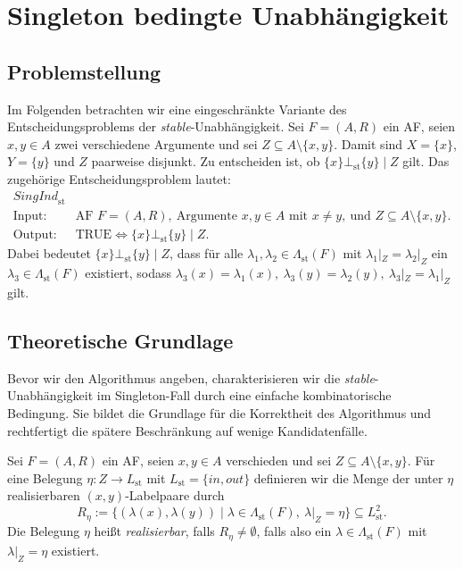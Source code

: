 \chapter{Singleton bedingte Unabhängigkeit}
\label{ch:singl-ci}

\section{Problemstellung}
\label{sec:singl-ci-def}
Im Folgenden betrachten wir eine eingeschränkte Variante des Entscheidungsproblems
der \textit{stable}-Unabhängigkeit. Sei \(F=(A,R)\) ein AF, seien
\(x,y\in A\) zwei verschiedene Argumente und sei
\(Z\subseteq A\setminus\{x,y\}\). Damit sind
\(X=\{x\}\), \(Y=\{y\}\) und \(Z\) paarweise disjunkt. Zu entscheiden ist, ob \(\{x\}\bot_{\mathrm{st}}\{y\}\mid Z\)
gilt. Das zugehörige Entscheidungsproblem lautet:
\[
\begin{array}{ll}
\textit{SingInd}_{\mathrm{st}}\\[2mm]
\text{Input:}  & \text{AF } F=(A,R),\ \text{Argumente } x,y\in A
                 \text{ mit } x\neq y,\ \text{und } Z\subseteq A\setminus\{x,y\}.\\[1mm]
\text{Output:} & \text{TRUE} \Longleftrightarrow
                 \{x\}\bot_{\mathrm{st}}\{y\}\mid Z.
\end{array}
\]
Dabei bedeutet \(\{x\}\bot_{\mathrm{st}}\{y\}\mid Z\), dass für alle
\(\lambda_1,\lambda_2\in\Lambda_{\mathrm{st}}(F)\) mit
\(\lambda_1|_Z=\lambda_2|_Z\) ein \(\lambda_3\in\Lambda_{\mathrm{st}}(F)\)
existiert, sodass
    \(\lambda_3(x)=\lambda_1(x),~
    \lambda_3(y)=\lambda_2(y),~
    \lambda_3|_Z=\lambda_1|_Z\)
gilt.

\section{Theoretische Grundlage}
\label{sec:singl-ci-theorie}

Bevor wir den Algorithmus angeben, charakterisieren wir die
\textit{stable}-Unabhängigkeit im Singleton-Fall durch eine einfache
kombinatorische Bedingung. Sie bildet die Grundlage für die Korrektheit des
Algorithmus und rechtfertigt die spätere Beschränkung auf wenige
Kandidatenfälle.

\begin{Definition}
    \label{def:singl-realisierbar}
    Sei \(F=(A,R)\) ein AF, seien \(x,y\in A\) verschieden und sei
    \(Z\subseteq A\setminus\{x,y\}\). Für eine Belegung
    \(\eta:Z\to L_{\mathrm{st}}\) mit
    \(L_{\mathrm{st}}=\{\mathit{in},\mathit{out}\}\) definieren wir die Menge
    der unter \(\eta\) realisierbaren \((x,y)\)-Labelpaare durch
    \[
        R_\eta
        :=
        \bigl\{
        (\lambda(x),\lambda(y))
        \;\big|\;
        \lambda\in\Lambda_{\mathrm{st}}(F),\ \lambda|_Z=\eta
        \bigr\}
        \subseteq L_{\mathrm{st}}^2.
    \]
    Die Belegung \(\eta\) heißt \emph{realisierbar}, falls
    \(R_\eta\neq\emptyset\), falls also ein
    \(\lambda\in\Lambda_{\mathrm{st}}(F)\) mit \(\lambda|_Z=\eta\) existiert.
\end{Definition}

